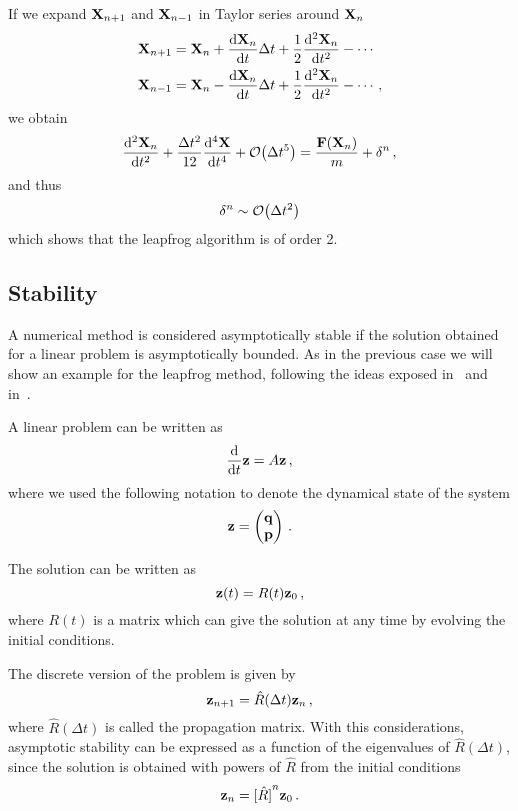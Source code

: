 \documentclass[12pt, class=report, crop=false]{standalone}
\begin{document}
If we expand \(\vb{X}_{n+1}\) and \(\vb{X}_{n-1}\) in Taylor series around \(\vb{X}_n\)
\begin{align*}
  \vb{X}_{n+1} &= \vb{X}_n + \dv{\vb{X}_n}{t}\Delta t + \frac{1}{2} \dv[2]{\vb{X}_n}{t} - \dotsb \\
  \vb{X}_{n-1} &= \vb{X}_n - \dv{\vb{X}_n}{t}\Delta t + \frac{1}{2} \dv[2]{\vb{X}_n}{t} - \dotsb\,,
\end{align*}
we obtain
\[
  \dv[2]{\vb{X}_n}{t} + \frac{\Delta t^2}{12} \dv[4]{\vb{X}}{t} + \order{\Delta t^5}
  = \frac{\vb{F}(\vb{X}_n)}{m} + \delta^n\,,
\]
and thus
\[
  \delta^n \sim \order{\Delta t^2}
\]
which shows that the leapfrog algorithm is of order 2.

\subsection{Stability}

A numerical method is considered asymptotically stable if the solution obtained
for a linear problem is asymptotically bounded.
As in the previous case we will show an example for the leapfrog method,
following the ideas exposed in~\cite{butcher_numericalmethods_2016}
and in~\textcite[Section 2.6]{leimkuhler_simulatinghamiltonian_2004}.

A linear problem can be written as
\[
\dv{t} \vb{z} = A \vb{z}\,,
\]
where we used the following notation to denote the dynamical state of the system
\[
\vb{z} =
\begin{pmatrix}
  \vb{q} \\
  \vb{p}
\end{pmatrix}\,.
\]

The solution can be written as
\begin{equation*}
  \vb{z}(t) = R(t) \vb{z}_0\,,
\end{equation*}
where \(R(t)\) is a matrix which can give the solution at any time by evolving
the initial conditions.

The discrete version of the problem is given by
\begin{equation}
  \label{eq:discrete-linear-problem}
  \vb{z}_{n+1} = \hat{R}(\Delta t) \vb{z}_n\,,
\end{equation}
where \(\hat{R}(\Delta t)\) is called the propagation matrix.
With this considerations, asymptotic stability can be expressed as a function
of the eigenvalues of \(\hat{R}(\Delta t)\), since the solution is obtained
with powers of \(\hat{R}\) from the initial conditions
\begin{equation*}
  \vb{z}_n = {[\hat{R}]}^n \vb{z}_0\,.
\end{equation*}
\end{document}
